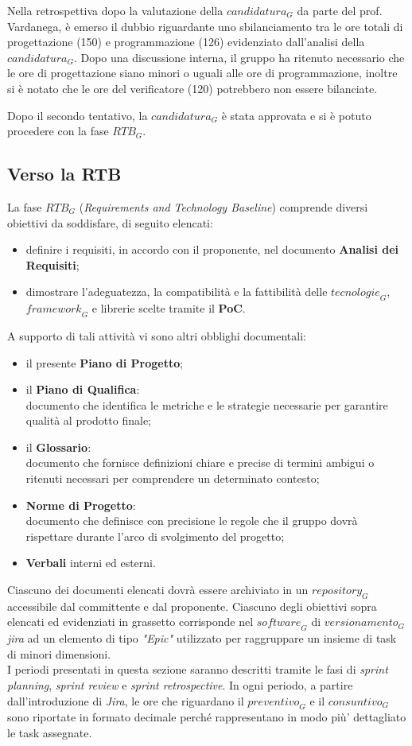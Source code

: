 Nella retrospettiva dopo la valutazione della $\textit{candidatura}_G$ da parte del prof. Vardanega, è emerso il dubbio riguardante uno sbilanciamento tra le ore totali di progettazione (150) e programmazione (126) evidenziato dall'analisi della $\textit{candidatura}_G$. Dopo una discussione interna, il gruppo ha ritenuto necessario che le ore di progettazione siano minori o uguali alle ore di programmazione, inoltre si è notato che le ore del verificatore (120) potrebbero non essere bilanciate.

Dopo il secondo tentativo, la $\textit{candidatura}_G$ è stata approvata e si è potuto procedere con la fase $\textit{RTB}_G$. 
\subsection{Verso la RTB}
La fase $\textit{RTB}_G$ (\emph{Requirements and Technology Baseline}) comprende diversi obiettivi da soddisfare, di seguito elencati:
\begin{itemize}
    \item definire i requisiti, in accordo con il proponente, nel documento \textbf{Analisi dei Requisiti};
    \item dimostrare l'adeguatezza, la compatibilità e la fattibilità delle $\textit{tecnologie}_G$, $\textit{framework}_G$ e librerie scelte tramite il \textbf{PoC}.
\end{itemize}
A supporto di tali attività vi sono altri obblighi documentali:
\begin{itemize}
    \item il presente \textbf{Piano di Progetto};
    \item il \textbf{Piano di Qualifica}:\\
    documento che identifica le metriche e le strategie necessarie per garantire qualità al prodotto finale;
    \item il \textbf{Glossario}:\\
    documento che fornisce definizioni chiare e precise di termini ambigui o ritenuti necessari per comprendere un determinato contesto;
    \item \textbf{Norme di Progetto}:\\
    documento che definisce con precisione le regole che il gruppo dovrà rispettare durante l'arco di svolgimento del progetto;
    \item \textbf{Verbali} interni ed esterni.
\end{itemize}
Ciascuno dei documenti elencati dovrà essere archiviato in un  $\textit{repository}_G$ accessibile dal committente e dal proponente. Ciascuno degli obiettivi sopra elencati ed evidenziati in grassetto corrisponde nel $\textit{software}_G$ di $\textit{versionamento}_G$ \emph{jira} ad un elemento di tipo \emph{"Epic"} utilizzato per raggruppare un insieme di task di minori dimensioni.\\
I periodi presentati in questa sezione saranno descritti tramite le fasi di \emph{sprint planning}, \emph{sprint review} e \emph{sprint retrospective}. In ogni periodo, a partire dall'introduzione di \emph{Jira}, le ore che riguardano il $\textit{preventivo}_G$ e il $\textit{consuntivo}_G$ sono riportate in formato decimale perché rappresentano in modo più' dettagliato le task assegnate.

